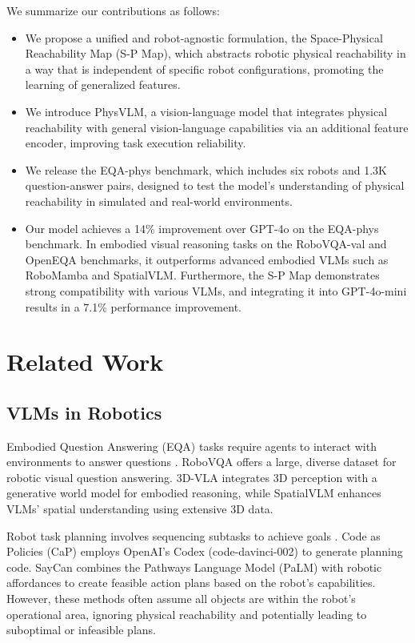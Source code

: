\documentclass[10pt,twocolumn,letterpaper]{article}
\begin{document}
We summarize our contributions as follows:
\begin{itemize}
\item We propose a unified and robot-agnostic formulation, the Space-Physical Reachability Map (S-P Map), which abstracts robotic physical reachability in a way that is independent of specific robot configurations, promoting the learning of generalized features.
\item We introduce PhysVLM, a vision-language model that integrates physical reachability with general vision-language capabilities via an additional feature encoder, improving task execution reliability.
\item We release the EQA-phys benchmark, which includes six robots and 1.3K question-answer pairs, designed to test the model's understanding of physical reachability in simulated and real-world environments.
\item Our model achieves a 14\% improvement over GPT-4o on the EQA-phys benchmark. In embodied visual reasoning tasks on the RoboVQA-val and OpenEQA benchmarks, it outperforms advanced embodied VLMs such as RoboMamba and SpatialVLM. Furthermore, the S-P Map demonstrates strong compatibility with various VLMs, and integrating it into GPT-4o-mini results in a 7.1\% performance improvement.
\end{itemize}

\section{Related Work}

\subsection{VLMs in Robotics}

Embodied Question Answering (EQA) tasks require agents to interact with environments to answer questions \cite{palme, eqa1, eqa2}. RoboVQA offers a large, diverse dataset for robotic visual question answering. 3D-VLA \cite{3dvla} integrates 3D perception with a generative world model for embodied reasoning, while SpatialVLM \cite{spatialvlm} enhances VLMs' spatial understanding using extensive 3D data.

Robot task planning involves sequencing subtasks to achieve goals \cite{plan1, plan2, plan3}. Code as Policies (CaP) \cite{cap} employs OpenAI's Codex (code-davinci-002) to generate planning code. SayCan \cite{saycan} combines the Pathways Language Model (PaLM) \cite{palm} with robotic affordances to create feasible action plans based on the robot's capabilities. However, these methods often assume all objects are within the robot's operational area, ignoring physical reachability and potentially leading to suboptimal or infeasible plans.
\end{document}
